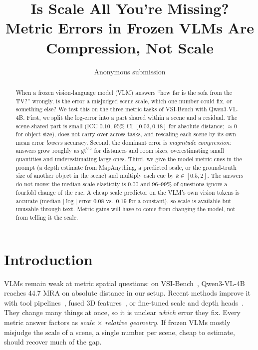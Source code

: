 \documentclass[10pt,twocolumn,letterpaper]{article}
\title{Is Scale All You're Missing?\\Metric Errors in Frozen VLMs Are Compression, Not Scale}
\author{Anonymous submission}
\date{}
\begin{document}
\maketitle

\begin{abstract}
When a frozen vision-language model (VLM) answers ``how far is the sofa from the TV?''
wrongly, is the error a misjudged scene scale, which one number could fix, or something else?
We test this on the three metric tasks of VSI-Bench with Qwen3-VL-4B. First, we split the
log-error into a part shared within a scene and a residual. The scene-shared part is small
(ICC $0.10$, 95\% CI $[0.03, 0.18]$ for absolute distance; $\approx 0$ for object size),
does not carry over across tasks, and rescaling each scene by its own mean error
\emph{lowers} accuracy. Second, the dominant error is \emph{magnitude compression}: answers grow
roughly as $\text{gt}^{0.5}$ for distances and room sizes, overestimating small quantities and
underestimating large ones. Third, we give the model metric cues in the prompt (a depth estimate from
MapAnything, a predicted scale, or the ground-truth size of another object in the scene)
and multiply each cue by $k \in [0.5, 2]$. The answers do not move: the median scale elasticity is
$0.00$ and 96--99\% of questions ignore a fourfold change of the cue. A cheap scale
predictor on the VLM's own vision tokens is accurate (median $|\log|$ error $0.08$ vs.\ $0.19$ for a
constant), so scale is available but unusable through text. Metric gains will have to come
from changing the model, not from telling it the scale.
\end{abstract}

\section{Introduction}
VLMs remain weak at metric spatial questions: on VSI-Bench~\cite{yang2025thinking},
Qwen3-VL-4B reaches 44.7 MRA on absolute distance in our setup. Recent methods
improve it with tool pipelines~\cite{seeingnotmeasuring}, fused 3D features~\cite{fan2025vlm3r},
or fine-tuned scale and depth heads~\cite{robotracer,densedepthvlm}. They change many things at once,
so it is unclear \emph{which} error they fix. Every metric answer factors as
\emph{scale $\times$ relative geometry}. If frozen VLMs mostly misjudge the scale of a scene,
a single number per scene, cheap to estimate, should recover much of the gap.
\end{document}
